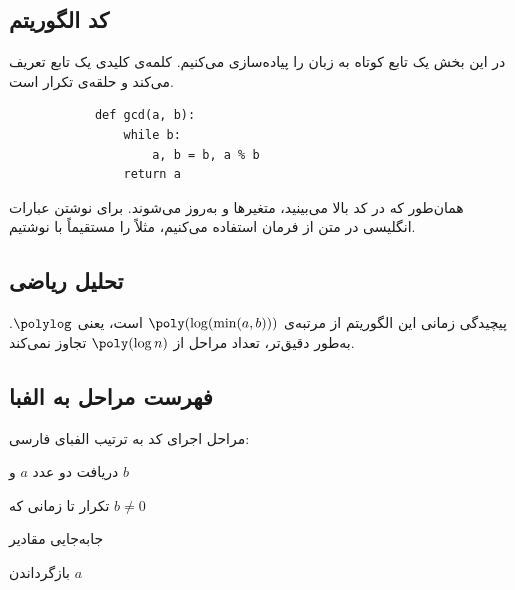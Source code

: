 
\subsection{کد الگوریتم}
در این بخش یک تابع کوتاه به زبان  را پیاده‌سازی می‌کنیم.
کلمه‌ی کلیدی  یک تابع تعریف می‌کند و  حلقه‌ی تکرار است.
\begin{listing}[H]
    \begin{latin}
        \begin{verbatim}
            def gcd(a, b):
                while b:
                    a, b = b, a % b
                return a
        \end{verbatim}
    \end{latin}
\end{listing}

همان‌طور که در کد بالا می‌بینید، متغیرها  و  به‌روز می‌شوند.
برای نوشتن عبارات انگلیسی در متن از فرمان  استفاده می‌کنیم، مثلاً  را مستقیماً با  نوشتیم.

\subsection{تحلیل ریاضی}
پیچیدگی زمانی این الگوریتم از مرتبه‌ی $\poly(\log(\min(a,b)))$ است، یعنی $\polylog$. به‌طور دقیق‌تر، تعداد مراحل از $\poly(\log n)$ تجاوز نمی‌کند.

\subsection{فهرست مراحل به الفبا}
مراحل اجرای کد به ترتیب الفبای فارسی:
\begin{الفبا}
	\item دریافت دو عدد $a$ و $b$
	\item تکرار تا زمانی که $b \neq 0$
	\item جابه‌جایی مقادیر
	\item بازگرداندن $a$
\end{الفبا}